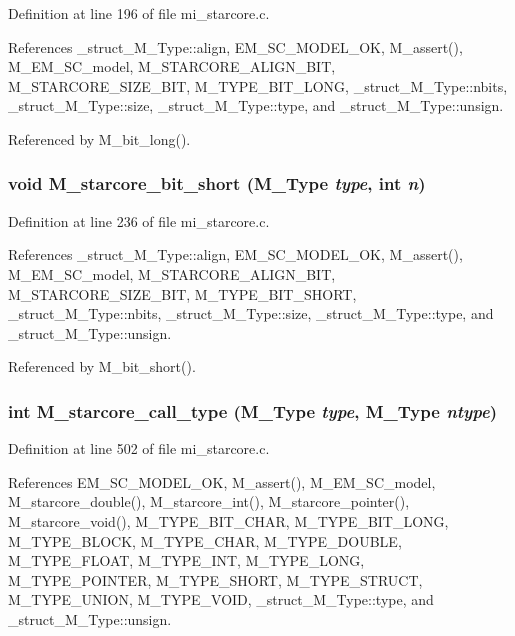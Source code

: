 Definition at line 196 of file mi\_\-starcore.c.

References \_\-struct\_\-M\_\-Type::align, EM\_\-SC\_\-MODEL\_\-OK, M\_\-assert(), M\_\-EM\_\-SC\_\-model, M\_\-STARCORE\_\-ALIGN\_\-BIT, M\_\-STARCORE\_\-SIZE\_\-BIT, M\_\-TYPE\_\-BIT\_\-LONG, \_\-struct\_\-M\_\-Type::nbits, \_\-struct\_\-M\_\-Type::size, \_\-struct\_\-M\_\-Type::type, and \_\-struct\_\-M\_\-Type::unsign.

Referenced by M\_\-bit\_\-long().
\subsubsection{\setlength{\rightskip}{0pt plus 5cm}void M\_\-starcore\_\-bit\_\-short (\bf{M\_\-Type} {\em type}, int {\em n})}\label{m__starcore_8h_2566e0afc1d6c6a6960477399f3ed1f2}




Definition at line 236 of file mi\_\-starcore.c.

References \_\-struct\_\-M\_\-Type::align, EM\_\-SC\_\-MODEL\_\-OK, M\_\-assert(), M\_\-EM\_\-SC\_\-model, M\_\-STARCORE\_\-ALIGN\_\-BIT, M\_\-STARCORE\_\-SIZE\_\-BIT, M\_\-TYPE\_\-BIT\_\-SHORT, \_\-struct\_\-M\_\-Type::nbits, \_\-struct\_\-M\_\-Type::size, \_\-struct\_\-M\_\-Type::type, and \_\-struct\_\-M\_\-Type::unsign.

Referenced by M\_\-bit\_\-short().
\subsubsection{\setlength{\rightskip}{0pt plus 5cm}int M\_\-starcore\_\-call\_\-type (\bf{M\_\-Type} {\em type}, \bf{M\_\-Type} {\em ntype})}\label{m__starcore_8h_75df2a8c3079ec3f14b7f1171a7b08cd}




Definition at line 502 of file mi\_\-starcore.c.

References EM\_\-SC\_\-MODEL\_\-OK, M\_\-assert(), M\_\-EM\_\-SC\_\-model, M\_\-starcore\_\-double(), M\_\-starcore\_\-int(), M\_\-starcore\_\-pointer(), M\_\-starcore\_\-void(), M\_\-TYPE\_\-BIT\_\-CHAR, M\_\-TYPE\_\-BIT\_\-LONG, M\_\-TYPE\_\-BLOCK, M\_\-TYPE\_\-CHAR, M\_\-TYPE\_\-DOUBLE, M\_\-TYPE\_\-FLOAT, M\_\-TYPE\_\-INT, M\_\-TYPE\_\-LONG, M\_\-TYPE\_\-POINTER, M\_\-TYPE\_\-SHORT, M\_\-TYPE\_\-STRUCT, M\_\-TYPE\_\-UNION, M\_\-TYPE\_\-VOID, \_\-struct\_\-M\_\-Type::type, and \_\-struct\_\-M\_\-Type::unsign.


